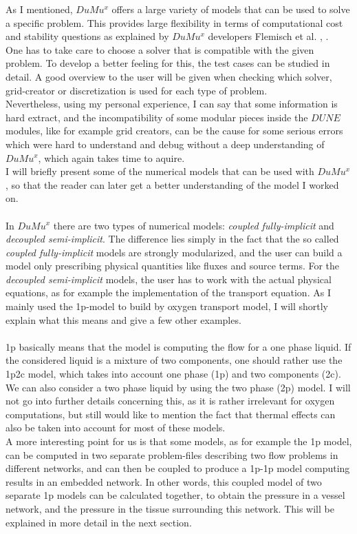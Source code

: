As I mentioned, $DuMu^x$ offers a large variety of models that can be used to solve a specific problem. This provides large flexibility in terms of computational cost and stability questions as explained by $DuMu^x$ developers Flemisch et al. \cite{flemischdumux}, \cite{flemisch2007dumux}.
\\One has to take care to choose a solver that is compatible with the given problem. To develop a better feeling for this, the test cases can be studied in detail. A good overview to the user will be given when checking which solver, grid-creator or discretization is used for each type of problem.
\\Nevertheless, using my personal experience, I can say that some information is hard extract, and the incompatibility of some modular pieces inside the $DUNE$ modules, like for example grid creators, can be the cause for some serious errors which were hard to understand and debug without a deep understanding of $DuMu^x$, which again takes time to aquire.
\\I will briefly present some of the numerical models that can be used with $DuMu^x$, so that the reader can later get a better understanding of the model I worked on.\\
\\In $DuMu^x$ there are two types of numerical models: \emph{coupled fully-implicit} and \emph{decoupled semi-implicit}. The difference lies simply in the fact that the so called \emph{coupled fully-implicit} models are strongly modularized, and the user can build a model only prescribing physical quantities like fluxes and source terms. For the \emph{decoupled semi-implicit} models, the user has to work with the actual physical equations, as for example the implementation of the transport equation. As I mainly used the 1p-model to build by oxygen transport model, I will shortly explain what this means and give a few other examples.\\
\\1p basically means that the model is computing the flow for a one phase liquid. If the considered liquid is a mixture of two components, one should rather use the 1p2c model, which takes into account one phase (1p) and two components (2c). We can also consider a two phase liquid by using the two phase (2p) model. I will not go into further details concerning this, as it is rather irrelevant for oxygen computations, but still would like to mention the fact that thermal effects can also be taken into account for most of these models.
\\A more interesting point for us is that some models, as for example the 1p model, can be computed in two separate problem-files describing two flow problems in different networks, and can then be coupled to produce a 1p-1p model computing results in an embedded network. In other words, this coupled model of two separate 1p models can be calculated together, to obtain the pressure in a vessel network, and the pressure in the tissue surrounding this network. This will be explained in more detail in the next section.
